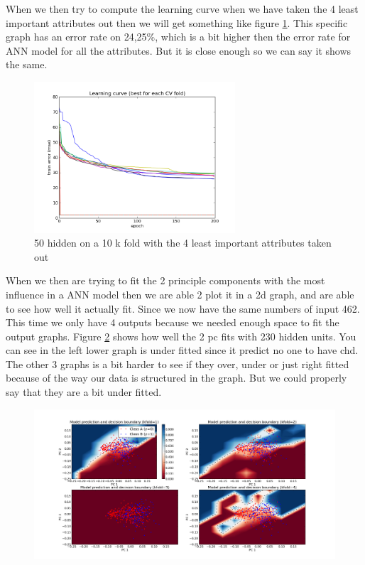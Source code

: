 When we then try to compute the learning curve when we have taken the 4 least important attributes out then we will get something like figure \ref{notfull_10_25_50}. This specific graph has an error rate on 24,25\%, which is a bit higher then the error rate for ANN model for all the attributes. But it is close enough so we can say it shows the same.
\begin{figure}[H]
\centering
\includegraphics[width=7.5cm, keepaspectratio=true]{pictures/figure_1.png}
\vspace{-0.4cm}
\caption{\footnotesize 50 hidden on a 10 k fold with the 4 least important attributes taken out}
\label{notfull_10_25_50}
\end{figure}
When we then are trying to fit the 2 principle components with the most influence in a ANN model then we are able 2 plot it in a 2d graph, and are able to see how well it actually fit. Since we now have the same numbers of input 462. This time we only have 4 outputs because we needed enough space to fit the output graphs. Figure \ref{ann} shows how well the 2 pc fits with 230 hidden units. You can see in the left lower graph is under fitted since it predict no one to have chd. The other 3 graphs is a bit harder to see if they over, under or just right fitted because of the way our data is structured in the graph. But we could properly say that they are a bit under fitted.
\begin{figure}[H]
\centering
\includegraphics[width=15cm, keepaspectratio=true]{pictures/ann_2_4_230.png}
\vspace{-0.7cm}
\caption{\footnotesize }
\label{ann}
\end{figure}
